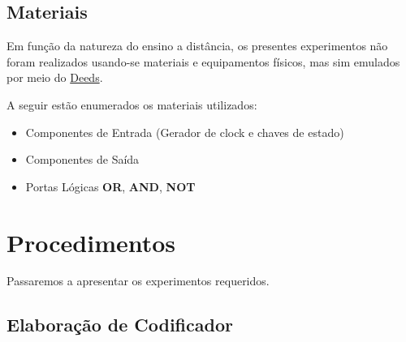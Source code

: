 \documentclass[12pt]{article}
\begin{document}
\subsection{Materiais}
\label{sec:Materiais}
Em função da natureza do ensino a distância, os presentes experimentos não foram
realizados usando-se materiais e equipamentos físicos, mas sim emulados por meio
do \href{https://www.digitalelectronicsdeeds.com/deeds.html}{Deeds}.

A seguir estão enumerados os materiais utilizados:
\begin{itemize}
    \item Componentes de Entrada (Gerador de clock e chaves de estado)
    \item Componentes de Saída
    \item Portas Lógicas \textbf{OR}, \textbf{AND}, \textbf{NOT}
\end{itemize}

\section{Procedimentos}
\label{sec:Procedimentos}

Passaremos a apresentar os experimentos requeridos.

\subsection{Elaboração de Codificador}\label{sec:2.1}
\end{document}
